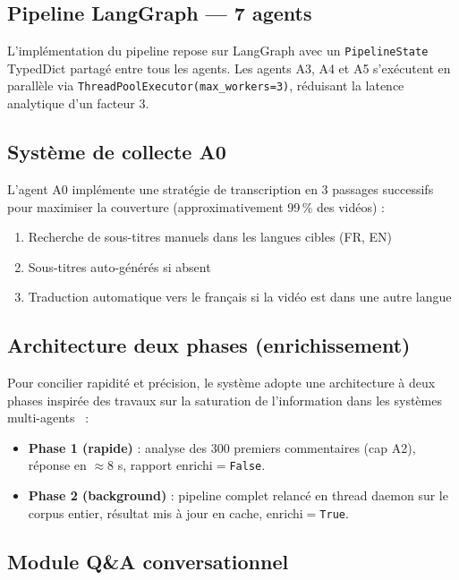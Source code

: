 \documentclass[12pt, a4paper]{article}
\begin{document}
\subsection{Pipeline LangGraph — 7 agents}

L'implémentation du pipeline repose sur LangGraph avec un \texttt{PipelineState}
TypedDict partagé entre tous les agents. Les agents A3, A4 et A5 s'exécutent
en parallèle via \texttt{ThreadPoolExecutor(max\_workers=3)}, réduisant la
latence analytique d'un facteur 3.

\subsection{Système de collecte A0}

L'agent A0 implémente une stratégie de transcription en 3 passages successifs
pour maximiser la couverture (approximativement 99\,\% des vidéos) :

\begin{enumerate}
  \item Recherche de sous-titres manuels dans les langues cibles (FR, EN)
  \item Sous-titres auto-générés si absent
  \item Traduction automatique vers le français si la vidéo est dans une autre langue
\end{enumerate}

\subsection{Architecture deux phases (enrichissement)}

Pour concilier rapidité et précision, le système adopte une architecture
à deux phases inspirée des travaux sur la saturation de l'information
dans les systèmes multi-agents~\cite{hong2023metagpt} :

\begin{itemize}
  \item \textbf{Phase 1 (rapide)} : analyse des 300 premiers commentaires
        (cap A2), réponse en $\approx$8 s, rapport enrichi$=$\texttt{False}.
  \item \textbf{Phase 2 (background)} : pipeline complet relancé en thread
        daemon sur le corpus entier, résultat mis à jour en cache,
        enrichi$=$\texttt{True}.
\end{itemize}

\subsection{Module Q\&A conversationnel}
\end{document}
